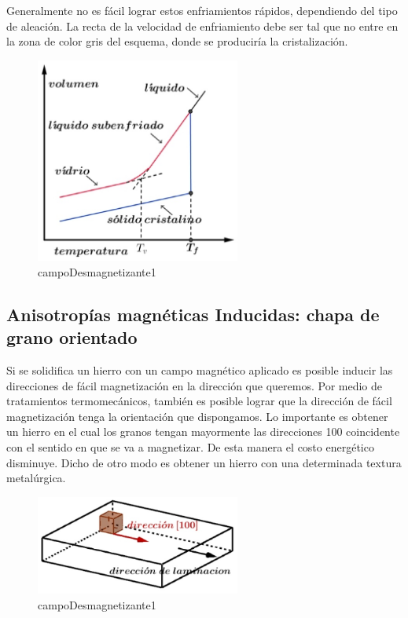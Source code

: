 Generalmente no es fácil lograr estos enfriamientos rápidos, dependiendo del tipo de aleación. La recta de la velocidad de enfriamiento debe ser tal que no entre en la zona de color gris del esquema, donde se produciría la cristalización.

\begin{figure}[H]
    \centering
    \hspace{1.0cm}
    \includegraphics[width=0.6\textwidth]{./Figures/amorfos2}
	\caption{campoDesmagnetizante1}
	\label{fig:amorfos2}
\end{figure}

\subsection{Anisotropías magnéticas Inducidas: chapa de grano orientado}

Si se solidifica un hierro con un campo magnético aplicado es posible inducir las direcciones de fácil magnetización en la dirección que queremos. Por medio de tratamientos termomecánicos, también es posible lograr que la dirección de fácil magnetización tenga la orientación que dispongamos. Lo importante es obtener un hierro en el cual los granos tengan mayormente las direcciones 100 coincidente con el sentido en que se va a magnetizar. De esta manera el costo energético
disminuye. Dicho de otro modo es obtener un hierro con una determinada textura metalúrgica.

\begin{figure}[H]
    \centering
    \includegraphics[width=0.6\textwidth]{./Figures/amorfos3}
	\caption{campoDesmagnetizante1}
	\label{fig:amorfos3}
\end{figure}


